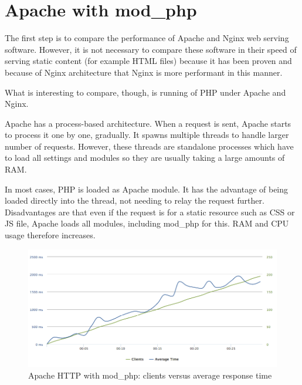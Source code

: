 \section{Apache with mod\_php}

The first step is to compare the performance of Apache and Nginx web serving software. However, it is not necessary to compare these software in their speed of serving static content (for example HTML files) because it has been proven and because of Nginx architecture that Nginx is more performant in this manner.

What is interesting to compare, though, is running of PHP under Apache and Nginx.

Apache has a process-based architecture. When a request is sent, Apache starts to process it one by one, gradually. It spawns multiple threads to handle larger number of requests. However, these threads are standalone processes which have to load all settings and modules so they are usually taking a large amounts of RAM.

In most cases, PHP is loaded as Apache module. It has the advantage of being loaded directly into the thread, not needing to relay the request further. Disadvantages are that even if the request is for a static resource such as CSS or JS file, Apache loads all modules, including mod\_php for this. RAM and CPU usage therefore increases.

\begin{figure}[H]
\begin{center}
\includegraphics[scale=0.5]{figures/Apache_mod_php.png}
\caption{Apache HTTP with mod\_php: clients versus average response time}
\label{fig:apache_mod_php}
\end{center}
\end{figure}

